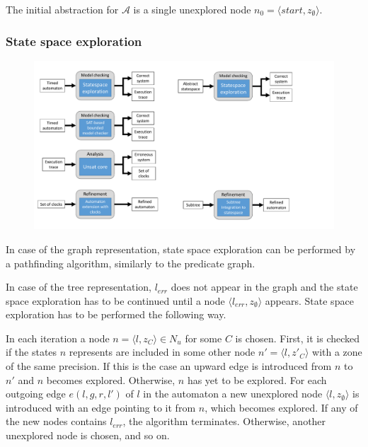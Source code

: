 \begin{runningExample}
\begin{runningExample}
	The initial abstraction for $\mathcal{A}$ is a single unexplored node $n_0=\langle \textit{start}, z_{\emptyset} \rangle$.
\end{runningExample}


\subsubsection{State space exploration}

\begin{figure}[h]
	\centering
	\includegraphics[width=.7\textwidth]{include/figures/modules_ssp_mc}
\end{figure}

In case of the graph representation, state space exploration can be performed by a pathfinding algorithm, similarly to the predicate graph.

In case of the tree representation, $l_{err}$ does not appear in the graph and the state space exploration has to be continued until a node $\langle l_{err}, z_{\emptyset} \rangle$ appears. State space exploration has to be performed the following way.

In each iteration a node $n=\langle l, z_{C} \rangle \in N_u$ for some $C$ is chosen. First, it is checked if the states $n$ represents are included in some other node $n'=\langle l, z'_{C} \rangle$ with a zone of the same precision. If this is the case an upward edge is introduced from $n$ to $n'$ and $n$ becomes explored. Otherwise, $n$ has yet to be explored. For each outgoing edge $e(l,g,r,l')$ of $l$ in the automaton a new unexplored node $\langle l, z_{\emptyset} \rangle$ is introduced with an edge pointing to it from $n$, which becomes explored. If any of the new nodes contains $l_{err}$, the algorithm terminates. Otherwise, another unexplored node is chosen, and so on.


\end{runningExample}
